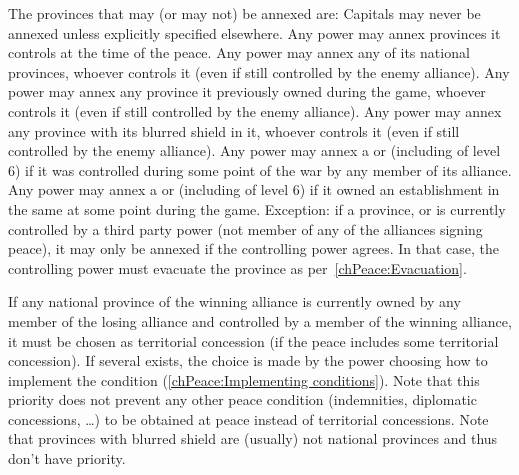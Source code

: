  The provinces that may (or may not) be annexed
are:
\bparag Capitals may never be annexed unless explicitly specified elsewhere.
\bparag Any power may annex provinces it controls at the time of the peace.
\bparag Any power may annex any of its national provinces, whoever controls it
(even if still controlled by the enemy alliance).
\bparag Any power may annex any province it previously owned during the game,
whoever controls it (even if still controlled by the enemy alliance).
\bparag Any power may annex any province with its blurred shield in it,
whoever controls it (even if still controlled by the enemy alliance).
\bparag Any power may annex a \TP or \COL (including of level 6) if it was
controlled during some point of the war by any member of its alliance.
\bparag Any power may annex a \TP or \COL (including of level 6) if it owned
an establishment in the same \Area at some point during the game.
\bparag Exception: if a province, \TP or \COL is currently controlled by a
third party power (not member of any of the alliances signing peace), it may
only be annexed if the controlling power agrees. In that case, the controlling
power must evacuate the province as per~\ref{chPeace:Evacuation}.

\aparag[Priority] If any national province of the winning alliance is
currently owned by any member of the losing alliance and controlled by a
member of the winning alliance, it must be chosen as territorial concession
(if the peace includes some territorial concession).
\bparag If several exists, the choice is made by the power choosing how to
implement the condition (\ref{chPeace:Implementing conditions}).
\bparag Note that this priority does not prevent any other peace condition
(indemnities, diplomatic concessions, \ldots) to be obtained at peace instead
of territorial concessions.
\bparag Note that provinces with blurred shield are (usually) not national
provinces and thus don't have priority.

